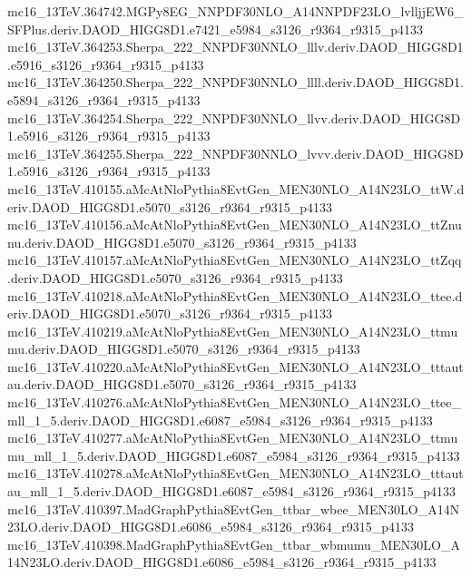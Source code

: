 \begin{footnotesize}
mc16\_13TeV.364742.MGPy8EG\_NNPDF30NLO\_A14NNPDF23LO\_lvlljjEW6\_SFPlus.deriv.DAOD\_HIGG8D1.e7421\_e5984\_s3126\_r9364\_r9315\_p4133 \\
mc16\_13TeV.364253.Sherpa\_222\_NNPDF30NNLO\_lllv.deriv.DAOD\_HIGG8D1.e5916\_s3126\_r9364\_r9315\_p4133 \\
mc16\_13TeV.364250.Sherpa\_222\_NNPDF30NNLO\_llll.deriv.DAOD\_HIGG8D1.e5894\_s3126\_r9364\_r9315\_p4133 \\
mc16\_13TeV.364254.Sherpa\_222\_NNPDF30NNLO\_llvv.deriv.DAOD\_HIGG8D1.e5916\_s3126\_r9364\_r9315\_p4133 \\
mc16\_13TeV.364255.Sherpa\_222\_NNPDF30NNLO\_lvvv.deriv.DAOD\_HIGG8D1.e5916\_s3126\_r9364\_r9315\_p4133 \\
mc16\_13TeV.410155.aMcAtNloPythia8EvtGen\_MEN30NLO\_A14N23LO\_ttW.deriv.DAOD\_HIGG8D1.e5070\_s3126\_r9364\_r9315\_p4133 \\
mc16\_13TeV.410156.aMcAtNloPythia8EvtGen\_MEN30NLO\_A14N23LO\_ttZnunu.deriv.DAOD\_HIGG8D1.e5070\_s3126\_r9364\_r9315\_p4133 \\
mc16\_13TeV.410157.aMcAtNloPythia8EvtGen\_MEN30NLO\_A14N23LO\_ttZqq.deriv.DAOD\_HIGG8D1.e5070\_s3126\_r9364\_r9315\_p4133 \\
mc16\_13TeV.410218.aMcAtNloPythia8EvtGen\_MEN30NLO\_A14N23LO\_ttee.deriv.DAOD\_HIGG8D1.e5070\_s3126\_r9364\_r9315\_p4133 \\
mc16\_13TeV.410219.aMcAtNloPythia8EvtGen\_MEN30NLO\_A14N23LO\_ttmumu.deriv.DAOD\_HIGG8D1.e5070\_s3126\_r9364\_r9315\_p4133 \\
mc16\_13TeV.410220.aMcAtNloPythia8EvtGen\_MEN30NLO\_A14N23LO\_tttautau.deriv.DAOD\_HIGG8D1.e5070\_s3126\_r9364\_r9315\_p4133 \\
mc16\_13TeV.410276.aMcAtNloPythia8EvtGen\_MEN30NLO\_A14N23LO\_ttee\_mll\_1\_5.deriv.DAOD\_HIGG8D1.e6087\_e5984\_s3126\_r9364\_r9315\_p4133 \\
mc16\_13TeV.410277.aMcAtNloPythia8EvtGen\_MEN30NLO\_A14N23LO\_ttmumu\_mll\_1\_5.deriv.DAOD\_HIGG8D1.e6087\_e5984\_s3126\_r9364\_r9315\_p4133 \\
mc16\_13TeV.410278.aMcAtNloPythia8EvtGen\_MEN30NLO\_A14N23LO\_tttautau\_mll\_1\_5.deriv.DAOD\_HIGG8D1.e6087\_e5984\_s3126\_r9364\_r9315\_p4133 \\
mc16\_13TeV.410397.MadGraphPythia8EvtGen\_ttbar\_wbee\_MEN30LO\_A14N23LO.deriv.DAOD\_HIGG8D1.e6086\_e5984\_s3126\_r9364\_r9315\_p4133 \\
mc16\_13TeV.410398.MadGraphPythia8EvtGen\_ttbar\_wbmumu\_MEN30LO\_A14N23LO.deriv.DAOD\_HIGG8D1.e6086\_e5984\_s3126\_r9364\_r9315\_p4133 \\

\end{footnotesize}
